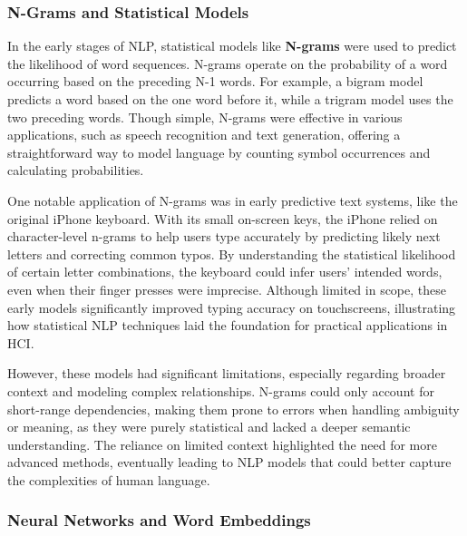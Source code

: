 \subsubsection{N-Grams and Statistical Models}

In the early stages of NLP, statistical models like \textbf{N-grams} were used to predict the likelihood of word sequences.
N-grams operate on the probability of a word occurring based on the preceding N-1 words.
For example, a bigram model predicts a word based on the one word before it, while a trigram model uses the two preceding words.
Though simple, N-grams were effective in various applications, such as speech recognition and text generation, offering a straightforward way to model language by counting symbol occurrences and calculating probabilities.

One notable application of N-grams was in early predictive text systems, like the original iPhone keyboard\cite{kocienda2018creative}.
With its small on-screen keys, the iPhone relied on character-level n-grams to help users type accurately by predicting likely next letters and correcting common typos.
By understanding the statistical likelihood of certain letter combinations, the keyboard could infer users' intended words, even when their finger presses were imprecise.
Although limited in scope, these early models significantly improved typing accuracy on touchscreens, illustrating how statistical NLP techniques laid the foundation for practical applications in HCI.

However, these models had significant limitations, especially regarding broader context and modeling complex relationships.
N-grams could only account for short-range dependencies, making them prone to errors when handling ambiguity or meaning, as they were purely statistical and lacked a deeper semantic understanding.
The reliance on limited context highlighted the need for more advanced methods, eventually leading to NLP models that could better capture the complexities of human language.

\subsubsection{ Neural Networks and Word Embeddings}


